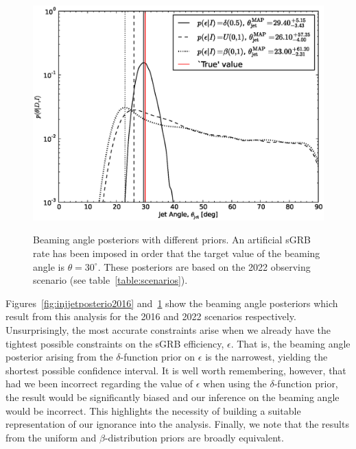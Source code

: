 \documentclass[twocolumn,nofootinbib]{revtex4-1}
\begin{document}
\begin{figure}%
\centering
{\includegraphics[width=\linewidth]{jet_angle_posterior_aligo_2022.eps}}
\caption{Beaming angle posteriors with different priors.
    An artificial \ac{sGRB} rate has been imposed in order that the target value of the beaming angle is $\theta = 30^{\circ}$.
    These posteriors are based on the 2022 observing scenario (see table~\ref{table:scenarios}).
    \label{fig:injjetposterio2022}}
\end{figure}
%
Figures~\ref{fig:injjetposterio2016} and~\ref{fig:injjetposterio2022} show the beaming angle posteriors which result from this analysis for the 2016 and 2022 scenarios respectively.
Unsurprisingly, the most accurate constraints arise when we already have the tightest possible constraints on the \ac{sGRB} efficiency, $\epsilon$.
That is, the beaming angle posterior arising from the $\delta$-function prior on $\epsilon$ is the narrowest, yielding the shortest possible confidence interval.
It is well worth remembering, however, that had we been incorrect regarding the value of $\epsilon$ when using the $\delta$-function prior, the result would be significantly biased and our inference on the beaming angle would be incorrect.
This highlights the necessity of building a suitable representation of our ignorance into the analysis.
Finally, we note that the results from the uniform and $\beta$-distribution priors are broadly equivalent.
\end{document}
